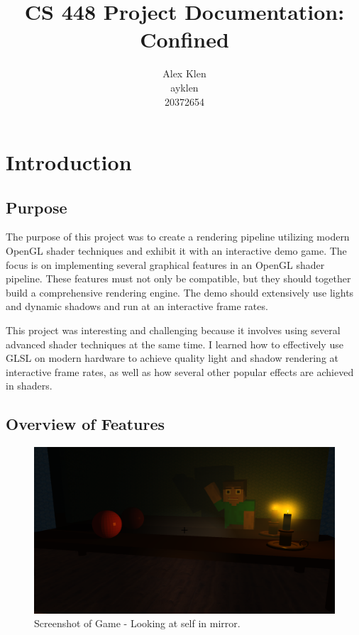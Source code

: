 \documentclass[oneside]{book}
\title{\huge CS 448  Project Documentation: Confined}
\author{Alex Klen \\ ayklen \\ 20372654}
\begin{document}
\maketitle
\tableofcontents

\chapter{Introduction}
  \section{Purpose}
    The purpose of this project was to create a rendering pipeline utilizing modern OpenGL shader techniques and exhibit it with an interactive demo game.
    The focus is on implementing several graphical features in an OpenGL shader pipeline. These features must not only be compatible, but they should together build a comprehensive rendering engine.
    The demo should extensively use lights and dynamic shadows and run at an interactive frame rates.

    This project was interesting and challenging because it involves using several advanced shader techniques at the same time. I learned how to effectively use GLSL on modern hardware to achieve quality light and shadow rendering at interactive frame rates, as well as how several other popular effects are achieved in shaders.

  \section{Overview of Features}
    \begin{figure}[h!]
      \centering
      \includegraphics[width=1.0\textwidth]{../screenshot01.png}
      \caption{Screenshot of Game - Looking at self in mirror.}
      \label{screenshot01}
    \end{figure}
\end{document}
